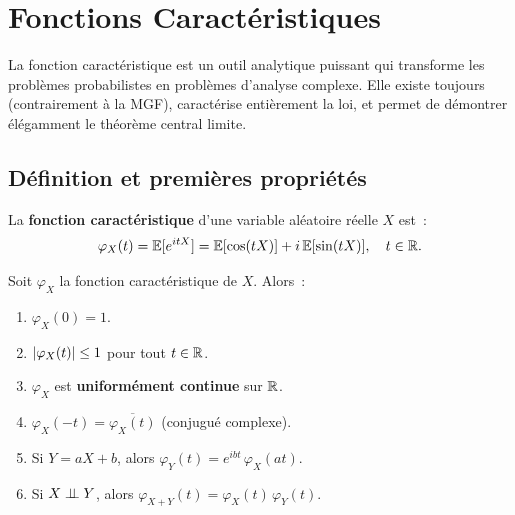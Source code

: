 \chapter{Fonctions Caract\'eristiques}
\label{ch:caracteristiques}

\begin{intuition}
La fonction caract\'eristique est un outil analytique puissant qui transforme les
probl\`emes probabilistes en probl\`emes d'analyse complexe. Elle existe toujours
(contrairement \`a la MGF), caract\'erise enti\`erement la loi, et permet de
d\'emontrer \'el\'egamment le th\'eor\`eme central limite.
\end{intuition}

\section{D\'efinition et premi\`eres propri\'et\'es}

\begin{definition}
La \textbf{fonction caract\'eristique} d'une variable al\'eatoire r\'eelle $X$ est~:
\[
    \varphi_X(t) = \mathbb{E}[e^{itX}] = \mathbb{E}[\cos(tX)] + i\,\mathbb{E}[\sin(tX)], \quad t \in \mathbb{R}.
\]
\end{definition}

\begin{theoreme}
\label{thm:prop_fc}
Soit $\varphi_X$ la fonction caract\'eristique de $X$. Alors~:
\begin{enumerate}[label=(\roman*)]
    \item $\varphi_X(0) = 1$.
    \item $\left| \varphi_X(t) \right| \leq 1$ pour tout $t \in \mathbb{R}$.
    \item $\varphi_X$ est \textbf{uniform\'ement continue} sur $\mathbb{R}$.
    \item $\varphi_X(-t) = \overline{\varphi_X(t)}$ (conjugu\'e complexe).
    \item Si $Y = aX + b$, alors $\varphi_Y(t) = e^{ibt}\, \varphi_X(at)$.
    \item Si $X \perp\!\!\!\perp Y$, alors $\varphi_{X+Y}(t) = \varphi_X(t)\, \varphi_Y(t)$.
\end{enumerate}
\end{theoreme}

